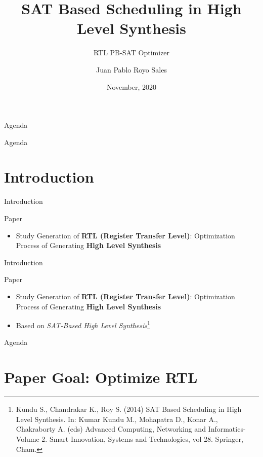 \documentclass{beamer}
\title{SAT Based Scheduling in High Level Synthesis}
\subtitle{RTL PB-SAT Optimizer}
\author{Juan Pablo Royo Sales}
\institute{Universitat Politècnica de Catalunya}
\date{November, 2020}
\begin{document}
\begin{frame}
\titlepage
\end{frame}

\begin{frame}{Agenda}
  \tableofcontents
\end{frame}

\begin{frame}{Agenda}
  \section{Introduction}
  \tableofcontents[currentsection]
\end{frame}

\begin{frame}[fragile]{Introduction}
  \begin{block}{Paper}
      \begin{itemize}
        \item Study Generation of \textbf{RTL (Register Transfer Level)}: Optimization Process of Generating \textbf{High Level Synthesis} 
    \end{itemize}
  \end{block}
\end{frame}

\begin{frame}[fragile]{Introduction}
  \begin{block}{Paper}
      \begin{itemize}
        \item Study Generation of \textbf{RTL (Register Transfer Level)}: Optimization Process of Generating \textbf{High Level Synthesis} 
        \item Based on \textit{SAT-Based High Level Synthesis}\footnote{Kundu S., Chandrakar K., Roy S. (2014) SAT Based Scheduling in High Level Synthesis. In: Kumar Kundu M., Mohapatra D., Konar A., Chakraborty A. (eds) Advanced Computing, Networking and Informatics- Volume 2. Smart Innovation, Systems and Technologies, vol 28. Springer, Cham.}
    \end{itemize}
  \end{block}
\end{frame}


\begin{frame}{Agenda}
  \section{Paper Goal: Optimize RTL}
  \tableofcontents[currentsection]
\end{frame}
\end{document}
